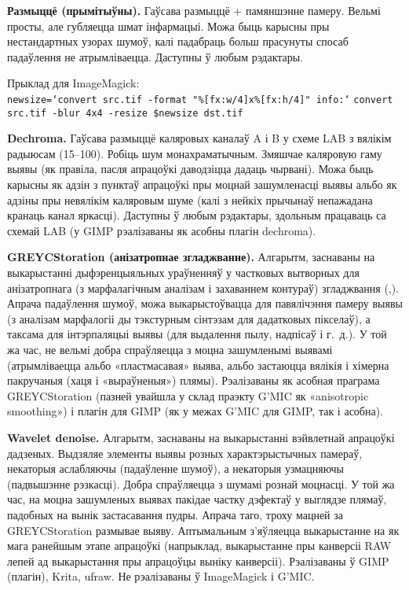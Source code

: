 \documentclass[10pt, a5paper]{article}
\def\fakeparagraph#1{\textbf{#1}}
\begin{document}
{\fakeparagraph{Размыццё (прымітыўны).}
Гаўсава размыццё + памяншэнне памеру. Вельмі просты, але губляецца шмат інфармацыі. Можа быць карысны пры нестандартных узорах шумоў, калі падабраць больш прасунуты спосаб падаўлення не атрымліваецца. Даступны ў любым рэдактары.

Прыклад для {ImageMagick}:\\
\texttt{newsize=`convert src.tif -format "\%[fx:w/4]x\%[fx:h/4]" info:`}
\texttt{convert src.tif -blur 4x4 -resize \$newsize dst.tif}

\fakeparagraph{Dechroma.}
Гаўсава размыццё каляровых каналаў A і B у схеме LAB з вялікім радыюсам (15--100). Робіць шум монахраматычным. Змяшчае каляровую гаму выявы (як правіла, пасля апрацоўкі даводзіцца дадаць чырвані). Можа быць карысны як адзін з пунктаў апрацоўкі пры моцнай зашумленасці выявы альбо як адзіны пры невялікім каляровым шуме (калі з нейкіх прычынаў непажадана кранаць канал яркасці). Даступны ў любым рэдактары, здольным працаваць са схемай LAB (у {GIMP} рэалізаваны як асобны плагін {dechroma}).

\fakeparagraph{GREYCStoration (анізатропнае згладжванне).}
Алгарытм, \linebreak заснаваны на выкарыстанні дыфэренцыяльных ураўненняў у частковых вытворных для анізатропнага (з марфалагічным аналізам і захаваннем контураў) згладжвання (\cite{litvw1},\cite{litvw2}). Апрача падаўлення шумоў, можа выкарыстоўвацца для павялічэння памеру выявы (з аналізам марфалогіі ды тэкстурным сінтэзам для дадатковых пікселаў), а таксама для інтэрпаляцыі выявы (для выдалення пылу, надпісаў і г.~д.). У той жа час, не вельмі добра спраўляецца з моцна зашумленымі выявамі (атрымліваецца альбо «пластмасавая» выява, альбо застаюцца вялікія і хімерна пакручаныя (хаця і «выраўненыя») плямы).  Рэалізаваны як асобная праграма {GREYCStoration} (пазней увайшла у склад праэкту {G'MIC} як «anisotropic smoothing»)  і плагін для {GIMP} (як у межах {G'MIC для GIMP}, так і асобна).

\fakeparagraph{Wavelet denoise.}
Алгарытм, заснаваны на выкарыстанні вэйвлетнай апрацоўкі дадзеных. Выдзяляе элементы выявы розных характэрыстычных памераў, некаторыя аслабляючы (падаўленне шумоў), а некаторыя узмацняючы (падвышэнне рэзкасці).  Добра спраўляецца з шумамі рознай моцнасці. У той жа час, на моцна зашумленых выявах пакідае частку дэфектаў у выглядзе плямаў, падобных на вынік застасавання пудры. Апрача таго, троху мацней за GREYCStoration размывае выяву. Аптымальным з’яўляецца выкарыстанне на як мага ранейшым этапе апрацоўкі (напрыклад, выкарыстанне пры канверсіі RAW лепей ад выкарыстання пры апрацоўцы выніку канверсіі). Рэалізаваны ў {GIMP} (плагін), {Krita}, {ufraw}. Не рэалізаваны ў {ImageMagick} і {G'MIC}.

}
\end{document}
